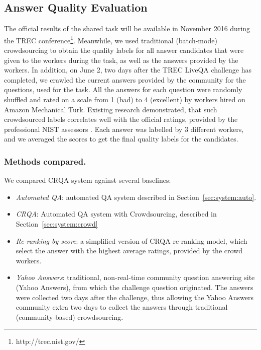 \subsection{Answer Quality Evaluation}
\label{sec:experiments:answer-quality-evaluation}

The official results of the shared task will be available in November 2016 during the TREC conference\footnote{http://trec.nist.gov/}.
Meanwhile, we used traditional (batch-mode) crowdsourcing to obtain the quality labels for all answer candidates that were given to the workers during the task, as well as the answers provided by the workers.
In addition, on June 2, two days after the TREC LiveQA challenge has completed, we crawled the current answers provided by the community for the questions, used for the task.
All the answers for each question were randomly shuffled and rated on a scale from 1 (bad) to 4 (excellent) by workers hired on Amazon Mechanical Turk.
Existing research demonstrated, that such crowdsourced labels correlates well with the official ratings, provided by the professional NIST assessors \cite{savenkov_crowdsourcing2016a}.
Each answer was labelled by 3 different workers, and we averaged the scores to get the final quality labels for the candidates.


\subsubsection{Methods compared.}
We compared CRQA system against several baselines:
\begin{itemize}
\item \textit{Automated QA}: automated QA system described in Section~\ref{sec:system:auto}.
\item \textit{CRQA}: Automated QA system with Crowdsourcing, described in Section~\ref{sec:system:crowd}
\item \textit{Re-ranking by score}: a simplified version of CRQA re-ranking model, which select the answer with the highest average ratings, provided by the crowd workers.
\item \textit{Yahoo Answers}: traditional, non-real-time community question answering site (Yahoo Answers), from which the challenge question originated. The answers were collected two days after the challenge, thus allowing the Yahoo Answers community extra two days to collect the answers through traditional (community-based) crowdsourcing.
\end{itemize}

